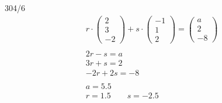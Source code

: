 \begin{exercise}{304/6}
  \begin{gather*}
    r \cdot \begin{pmatrix}2 \\ 3 \\ -2\end{pmatrix} + s \cdot \begin{pmatrix}-1 \\ 1 \\ 2\end{pmatrix} = \begin{pmatrix}a \\ 2 \\ -8\end{pmatrix} \\\\
    2r - s = a \\
    3r + s = 2 \\
    -2r + 2s = -8 \\\\
    a = 5.5 \\
    r = 1.5 \qquad s = -2.5
  \end{gather*}
\end{exercise}
